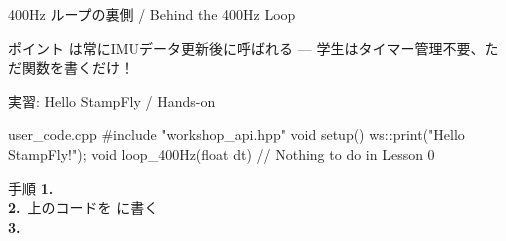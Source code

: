 \begin{frame}{400Hz ループの裏側 / Behind the 400Hz Loop}
  \begin{center}
    \vspace{-2mm}
    \resizebox{0.85\textwidth}{!}{}
  \end{center}

  \vspace{-0.5em}

  \begin{exampleblock}{ポイント}
     は常にIMUデータ更新後に呼ばれる
    --- 学生はタイマー管理不要、ただ関数を書くだけ！
  \end{exampleblock}
\end{frame}

\begin{frame}[fragile]{実習: Hello StampFly / Hands-on}
  \begin{sflisting}[basicstyle=\ttfamily\scriptsize]{user\_code.cpp}
#include "workshop_api.hpp"
void setup() {
    ws::print("Hello StampFly!");
}
void loop_400Hz(float dt) {
    // Nothing to do in Lesson 0
}
  \end{sflisting}
  \vspace{-0.5em}
  \begin{exampleblock}{手順}\small
    \textbf{1.}~\\
    \textbf{2.}~上のコードを  に書く\\
    \textbf{3.}~
  \end{exampleblock}
\end{frame}

